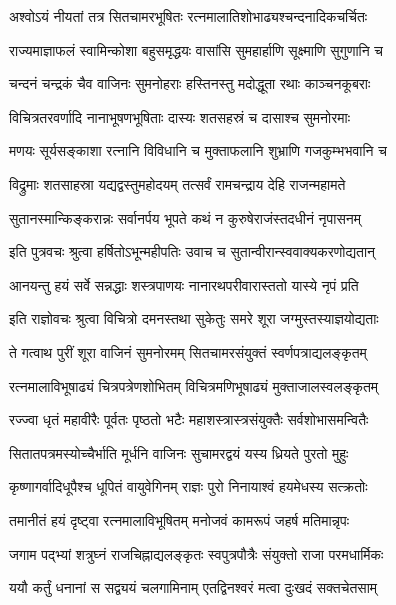 \twolineshloka
{अश्वोऽयं नीयतां तत्र सितचामरभूषितः}
{रत्नमालातिशोभाढ्यश्चन्दनादिकचर्चितः}%

\twolineshloka
{राज्यमाज्ञाफलं स्वामिन्कोशा बहुसमृद्धयः}
{वासांसि सुमहार्हाणि सूक्ष्माणि सुगुणानि च}%

\twolineshloka
{चन्दनं चन्द्रकं चैव वाजिनः सुमनोहराः}
{हस्तिनस्तु मदोद्धूता रथाः काञ्चनकूबराः}%

\twolineshloka
{विचित्रतरवर्णादि नानाभूषणभूषिताः}
{दास्यः शतसहस्रं च दासाश्च सुमनोरमाः}%

\twolineshloka
{मणयः सूर्यसङ्काशा रत्नानि विविधानि च}
{मुक्ताफलानि शुभ्राणि गजकुम्भभवानि च}%

\twolineshloka
{विद्रुमाः शतसाहस्रा यद्यद्वस्तुमहोदयम्}
{तत्सर्वं रामचन्द्राय देहि राजन्महामते}%

\twolineshloka
{सुतानस्मान्किङ्करान्नः सर्वानर्पय भूपते}
{कथं न कुरुषेराजंस्तदधीनं नृपासनम्}%


\twolineshloka
{इति पुत्रवचः श्रुत्वा हर्षितोऽभून्महीपतिः}
{उवाच च सुतान्वीरान्स्ववाक्यकरणोद्यतान्}%


\twolineshloka
{आनयन्तु हयं सर्वे सन्नद्धाः शस्त्रपाणयः}
{नानारथपरीवारास्ततो यास्ये नृपं प्रति}%


\twolineshloka
{इति राज्ञोवचः श्रुत्वा विचित्रो दमनस्तथा}
{सुकेतुः समरे शूरा जग्मुस्तस्याज्ञयोद्यताः}%

\twolineshloka
{ते गत्वाथ पुरीं शूरा वाजिनं सुमनोरमम्}
{सितचामरसंयुक्तं स्वर्णपत्राद्यलङ्कृतम्}%

\twolineshloka
{रत्नमालाविभूषाढ्यं चित्रपत्रेणशोभितम्}
{विचित्रमणिभूषाढ्यं मुक्ताजालस्वलङ्कृतम्}%

\twolineshloka
{रज्ज्वा धृतं महावीरैः पूर्वतः पृष्ठतो भटैः}
{महाशस्त्रास्त्रसंयुक्तैः सर्वशोभासमन्वितैः}%

\twolineshloka
{सितातपत्रमस्योच्चैर्भाति मूर्धनि वाजिनः}
{सुचामरद्वयं यस्य ध्रियते पुरतो मुहुः}%

\twolineshloka
{कृष्णागर्वादिधूपैश्च धूपितं वायुवेगिनम्}
{राज्ञः पुरो निनायाश्वं हयमेधस्य सत्क्रतोः}%

\twolineshloka
{तमानीतं हयं दृष्ट्वा रत्नमालाविभूषितम्}
{मनोजवं कामरूपं जहर्ष मतिमान्नृपः}%

\twolineshloka
{जगाम पद्भ्यां शत्रुघ्नं राजचिह्नाद्यलङ्कृतः}
{स्वपुत्रपौत्रैः संयुक्तो राजा परमधार्मिकः}%

\twolineshloka
{ययौ कर्तुं धनानां स सद्व्ययं चलगामिनाम्}
{एतद्विनश्वरं मत्वा दुःखदं सक्तचेतसाम्}%

